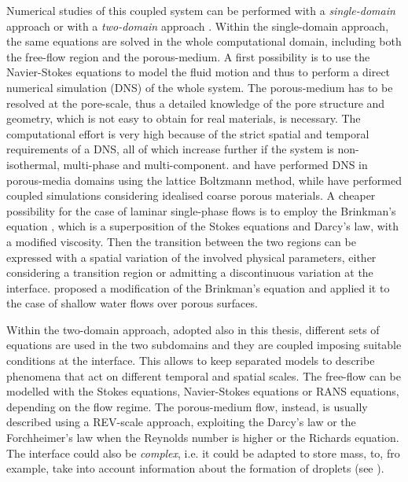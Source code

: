 Numerical studies of this coupled system can be performed with a 
\emph{single-domain} approach or with a \emph{two-domain} approach 
\cite{tesi:fetzer}.
Within the single-domain approach, the same equations are solved in the whole 
computational domain, including both the free-flow region and the 
porous-medium. A first possibility is to use the Navier-Stokes equations to model the 
fluid motion and thus to perform a direct numerical simulation (DNS) of the 
whole system. The porous-medium has to be resolved at the pore-scale, thus a 
detailed knowledge of the pore structure and geometry, which is not easy to obtain for real 
materials, is necessary. The computational effort is very high because 
of the strict spatial and temporal requirements of a DNS,
all of which increase further if the system
is non-isothermal, multi-phase and multi-component. \textcite{intro:dns} and \textcite{intro:dns2} have performed DNS in 
porous-media domains using the lattice Boltzmann method, while \textcite{intro:yang} have performed coupled simulations considering idealised coarse porous materials.
A cheaper possibility for the case of laminar single-phase flows is to employ the Brinkman's equation 
\cite{intro:brinkman}, which is a superposition of the Stokes equations and 
Darcy's law, with a modified viscosity. %
Then the transition between the two 
regions can be expressed with a spatial variation of the involved physical 
parameters, either considering a transition region or admitting a discontinuous 
variation at the interface. \textcite{intro:shavit} proposed a modification of 
the Brinkman's equation and applied it to the case of shallow water flows over 
porous surfaces.

Within the two-domain approach, adopted also in this thesis, different sets of 
equations are used in the two subdomains and they are coupled imposing suitable 
conditions at the interface. This allows to keep separated models to describe phenomena that act on different temporal and spatial scales. The free-flow can be modelled with the Stokes 
equations, Navier-Stokes equations or RANS equations, depending on the flow 
regime. The porous-medium flow, instead, is usually described using a REV-scale approach, exploiting the 
Darcy's law or the Forchheimer's law when the Reynolds number is higher or the 
Richards equation. The interface could also be \emph{complex}, i.e. it could be 
adapted to store mass, to, fro example, take into account information about the formation of droplets
(see \cite{tesi:baber}).

